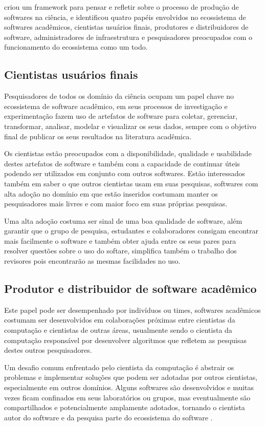  criou um framework para pensar e refletir
sobre o processo de produção de softwares na ciência, e identificou quatro
papéis envolvidos no ecossistema de softwares acadêmicos, cientistas usuários
finais, produtores e distribuidores de software, administradores de
infraestrutura e pesquisadores preocupados com o funcionamento do ecossistema
como um todo.

\subsection{Cientistas usuários finais}

Pesquisadores de todos os domínio da ciência ocupam um papel chave no
ecossistema de software acadêmico, em seus processos de investigação e
experimentação fazem uso de artefatos de software para coletar, gerenciar,
transformar, analisar, modelar e visualizar os seus dados, sempre com o
objetivo final de publicar os seus resultados na literatura acadêmica.

Os cientistas estão preocupados com a disponibilidade, qualidade e usabilidade
destes artefatos de software e também com a capacidade de continuar úteis
podendo ser utilizados em conjunto com outros softwares. Estão interessados
também em saber o que outros cientistas usam em suas pesquisas, softwares com
alta adoção no domínio em que estão inseridos costumam manter os pesquisadores
mais livres e com maior foco em suas próprias pesquisas.

Uma alta adoção costuma ser sinal de uma boa qualidade de software, além
garantir que o grupo de pesquisa, estudantes e colaboradores consigam encontrar
mais facilmente o software e também obter ajuda entre os seus pares para
resolver questões sobre o uso do softare, simplifica também o trabalho dos
revisores pois encontrarão as mesmas facilidades no uso.

\subsection{Produtor e distribuidor de software acadêmico}

Este papel pode ser desempenhado por indivíduos ou times, softwares acadêmicos
costumam ser desenvolvidos em colaborações próximas entre cientistas da
computação e cientistas de outras áreas, usualmente sendo o cientista da
computação responsável por desenvolver algoritmos que refletem as pesquisas
destes outros pesquisadores.

Um desafio comum enfrentado pelo cientista da computação é abstrair os
problemas e implementar soluções que podem ser adotadas por outros cientistas,
especialmente em outros domínios. Alguns softwares são desenvolvidos e muitas
vezes ficam confinados em seus laboratórios ou grupos, mas eventualmente são
compartilhados e potencialmente amplamente adotados, tornando o cientista autor
do software e da pesquisa parte do ecossistema do software
\cite{howison2015understanding}.


